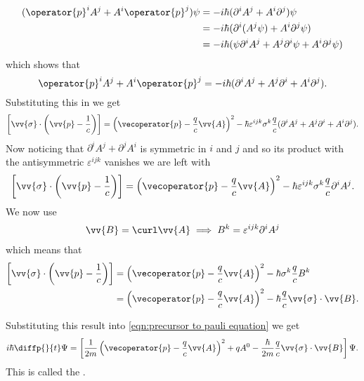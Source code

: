 \documentclass[fleqn]{NotesClass}
\begin{document}
    \begin{align}
        (\operator{p}^iA^j + A^i\operator{p}^j)\psi &= -i\hbar(\partial^iA^j + A^i\partial^j)\psi\\
        &= -i\hbar(\partial^i(A^j\psi) + A^i\partial^j\psi)\\
        &= -i\hbar(\psi\partial^iA^j + A^j\partial^i \psi + A^i\partial^j \psi)
    \end{align}
    which shows that
    \begin{equation}
        \operator{p}^i A^j + A^i\operator{p}^j = -i\hbar(\partial^iA^j + A^j\partial^i + A^i\partial^j).
    \end{equation}
    Substituting this in we get
    \begin{equation}
        \left[ \vv{\sigma} \cdot \left( \vv{p} - \frac{1}{c} \right) \right] = \left( \vecoperator{p} - \frac{q}{c}\vv{A} \right)^2 - \hbar \varepsilon^{ijk}\sigma^k \frac{q}{c} (\partial^iA^j + A^j\partial^i + A^i\partial^j).
    \end{equation}
    Now noticing that \(\partial^iA^j + \partial^jA^i\) is symmetric in \(i\) and \(j\) and so its product with the antisymmetric \(\varepsilon^{ijk}\) vanishes we are left with
    \begin{equation}
        \left[ \vv{\sigma} \cdot \left( \vv{p} - \frac{1}{c} \right) \right] = \left( \vecoperator{p} - \frac{q}{c}\vv{A} \right)^2 - \hbar\varepsilon^{ijk}\sigma^k\frac{q}{c} \partial^iA^j.
    \end{equation}
    We now use
    \begin{align}
        \vv{B} = \curl \vv{A} \implies B^k = \varepsilon^{ijk}\partial^iA^j
    \end{align}
    which means that
    \begin{align}
        \left[ \vv{\sigma} \cdot \left( \vv{p} - \frac{1}{c} \right) \right] &= \left( \vecoperator{p} - \frac{q}{c}\vv{A} \right)^2 - \hbar\sigma^k\frac{q}{c}B^k\\
        &= \left( \vecoperator{p} - \frac{q}{c}\vv{A} \right)^2 - \hbar\frac{q}{c} \vv{\sigma} \cdot \vv{B}.
    \end{align}
    
    Substituting this result into \cref{eqn:precursor to pauli equation} we get
    \begin{equation}
        i\hbar\diffp{}{t}\Psi = \left[ \frac{1}{2m}\left( \vecoperator{p} - \frac{q}{c}\vv{A} \right)^2 + qA^0 - \frac{\hbar}{2m}\frac{q}{c}\vv{\sigma} \cdot \vv{B} \right]\Psi.
    \end{equation}
    This is called the .
    
\end{document}
